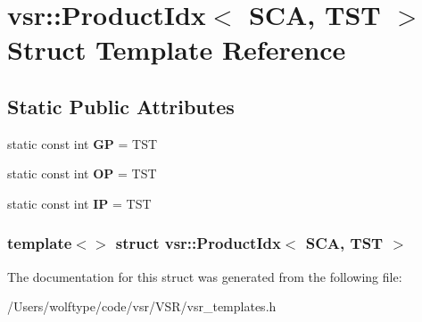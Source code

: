\hypertarget{structvsr_1_1_product_idx_3_01_s_c_a_00_01_t_s_t_01_4}{\section{vsr\-:\-:Product\-Idx$<$ S\-C\-A, T\-S\-T $>$ Struct Template Reference}
\label{structvsr_1_1_product_idx_3_01_s_c_a_00_01_t_s_t_01_4}
}
\subsection*{Static Public Attributes}
\begin{DoxyCompactItemize}
\item 
\hypertarget{structvsr_1_1_product_idx_3_01_s_c_a_00_01_t_s_t_01_4_a87020e95d25ee201de730f0a99551bef}{static const int {\bfseries G\-P} = T\-S\-T}\label{structvsr_1_1_product_idx_3_01_s_c_a_00_01_t_s_t_01_4_a87020e95d25ee201de730f0a99551bef}

\item 
\hypertarget{structvsr_1_1_product_idx_3_01_s_c_a_00_01_t_s_t_01_4_a6c1502f714fa390f89ccbcb9113e9d2a}{static const int {\bfseries O\-P} = T\-S\-T}\label{structvsr_1_1_product_idx_3_01_s_c_a_00_01_t_s_t_01_4_a6c1502f714fa390f89ccbcb9113e9d2a}

\item 
\hypertarget{structvsr_1_1_product_idx_3_01_s_c_a_00_01_t_s_t_01_4_a3ffa12c84c3be55338008855f7ed5057}{static const int {\bfseries I\-P} = T\-S\-T}\label{structvsr_1_1_product_idx_3_01_s_c_a_00_01_t_s_t_01_4_a3ffa12c84c3be55338008855f7ed5057}

\end{DoxyCompactItemize}
\subsubsection*{template$<$$>$ struct vsr\-::\-Product\-Idx$<$ S\-C\-A, T\-S\-T $>$}



The documentation for this struct was generated from the following file\-:\begin{DoxyCompactItemize}
\item 
/\-Users/wolftype/code/vsr/\-V\-S\-R/vsr\-\_\-templates.\-h\end{DoxyCompactItemize}
